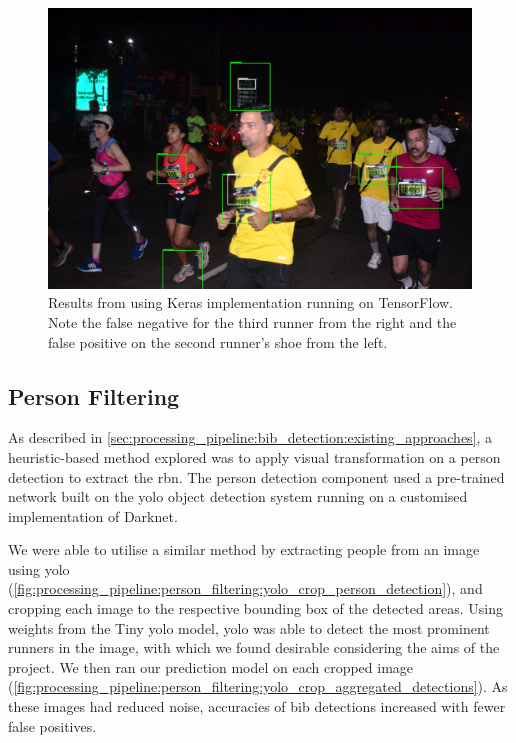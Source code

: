 \begin{figure}[h]
  \includegraphics[width=\textwidth]{images/processing/bib_only}
  \caption[Bib detection results using FRCNN]{Results from using \frcnn{} Keras implementation running on TensorFlow. Note the false negative for the third runner from the right and the false positive on the second runner's shoe from the left.}
  \label{fig:processing_pipeline:bib_only}
\end{figure}


\subsection{Person Filtering}
\label{sec:processing_pipeline:person_filtering}

As described in \cref{sec:processing_pipeline:bib_detection:existing_approaches}, a heuristic-based method explored was to apply visual transformation on a person detection to extract the \gls{rbn}. The person detection component used a pre-trained network built on the \gls{yolo} object detection system running on a customised implementation of Darknet.

We were able to utilise a similar method by extracting people from an image using \gls{yolo} (\cref{fig:processing_pipeline:person_filtering:yolo_crop_person_detection}), and cropping each image to the respective bounding box of the detected areas. Using weights from the Tiny \gls{yolo} model, \gls{yolo} was able to detect the most prominent runners in the image, with which we found desirable considering the aims of the project. We then ran our \frcnn{} prediction model on each cropped image (\cref{fig:processing_pipeline:person_filtering:yolo_crop_aggregated_detections}). As these images had reduced noise, accuracies of bib detections increased with fewer false positives. 

